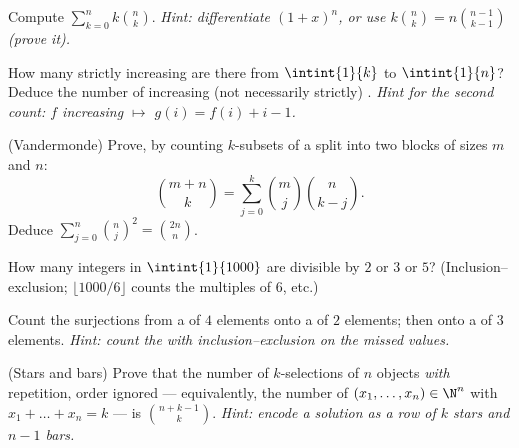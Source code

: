 \begin{exercise}[$\star$]\label{exo:b1:counting:5}
Compute $\sum_{k=0}^{n} k \binom{n}{k}$. \emph{Hint: differentiate
$(1 + x)^n$, or use $k \binom nk = n \binom{n-1}{k-1}$ (prove it).}
\end{exercise}

\begin{exercise}[$\star\star$]\label{exo:b1:counting:6}
How many strictly increasing  are there from $\intint{1}{k}$ to $\intint{1}{n}$? Deduce the number of
increasing (not necessarily strictly) . \emph{Hint for the second
count: $f$ increasing $\mapsto$ $g(i) = f(i) + i - 1$.}
\end{exercise}

\begin{exercise}[$\star\star$]\label{exo:b1:counting:7}
(Vandermonde) Prove, by counting $k$-subsets of a  split into two
blocks of sizes $m$ and $n$:
\[
\binom{m+n}{k} = \sum_{j=0}^{k} \binom{m}{j} \binom{n}{k-j} .
\]
Deduce $\sum_{j=0}^{n} \binom nj^2 = \binom{2n}{n}$.
\end{exercise}

\begin{exercise}[$\star\star$]\label{exo:b1:counting:8}
How many integers in $\intint{1}{1000}$ are divisible by
$2$ or $3$ or $5$? (Inclusion--exclusion; $\lfloor 1000/6 \rfloor$
counts the multiples of $6$, etc.)
\end{exercise}

\begin{exercise}[$\star\star$]\label{exo:b1:counting:9}
Count the surjections from a  of $4$ elements onto a  of $2$
elements; then onto a  of $3$ elements. \emph{Hint: count the
  with inclusion--exclusion on the missed values.}
\end{exercise}

\begin{exercise}[$\star\star$]\label{exo:b1:counting:10}
(Stars and bars) Prove that the number of $k$-selections of $n$
objects \emph{with} repetition, order ignored --- equivalently, the
number of $(x_1, \dots, x_n) \in \N^n$ with $x_1 + \dots + x_n = k$
--- is $\binom{n + k - 1}{k}$. \emph{Hint: encode a solution as a row
of $k$ stars and $n - 1$ bars.}
\end{exercise}

